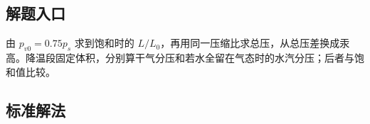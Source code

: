 \documentclass[UTF8,fontset=fandol,a4paper,11pt]{ctexart}
\begin{document}


\subsection*{解题入口}

由 $p_{v0}=0.75p_s$ 求到饱和时的 $L/L_0$，再用同一压缩比求总压，从总压差换成汞高。降温段固定体积，分别算干气分压和若水全留在气态时的水汽分压；后者与饱和值比较。



\subsection*{标准解法}
\end{document}
